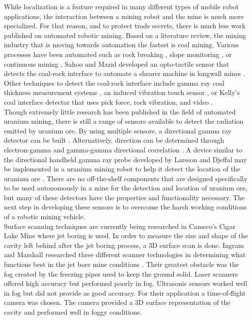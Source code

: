 While localization is a feature required in many different types of mobile robot applications, the interaction between a mining robot and the mine is much more specialized. For that reason, and to protect trade secrets, there is much less work published on automated robotic mining. Based on a literature review, the mining industry that is moving towards automation the fastest is coal mining. Various processes have been automated such as rock breaking \cite{breaker}, slope monitoring \cite{slope}, or continuous mining \cite{both}. Sahoo and Mazid developed an opto-tactile sensor that detects the coal-rock interface to automate a shearer machine in longwall mines \cite{opto}. Other techniques to detect the coal-rock interface include gamma ray coal thickness measurement systems \cite{gamma}, an induced vibration touch sensor \cite{vibe}, or Kelly's coal interface detector that uses pick force, rock vibration, and video \cite{kelly}.\\

Though extremely little research has been published in the field of automated uranium mining, there is still a range of sensors available to detect the radiation emitted by uranium ore. By using multiple sensors, a directional gamma ray detector can be built \cite{chip}. Alternatively, direction can be determined through electron-gamma and gamma-gamma directional correlation \cite{eggg}. A device similar to the directional handheld gamma ray probe developed by Larsson and Djeffal may be implemented in a uranium mining robot to help it detect the location of the uranium ore \cite{dj}. There are no off-the-shelf components that are designed specifically to be used autonomously in a mine for the detection and location of uranium ore, but many of these detectors have the properties and functionality necessary. The next step in developing these sensors is to overcome the harsh working conditions of a robotic mining vehicle.\\

Surface scanning techniques are currently being researched in Cameco's Cigar Lake Mine where jet boring is used. In order to measure the size and shape of the cavity left behind after the jet boring process, a 3D surface scan is done. Ingram and Marshall researched three different scanner technologies in determining what functions best in the jet bore mine conditions \cite{ingjet}. Their greatest obstacle was the fog created by the freezing pipes used to keep the ground solid. Laser scanners offered high accuracy but performed poorly in fog. Ultrasonic sensors worked well in fog but did not provide as good accuracy. For their application a time-of-flight camera was chosen. The camera provided a 3D surface representation of the cavity and performed well in foggy conditions.\\

